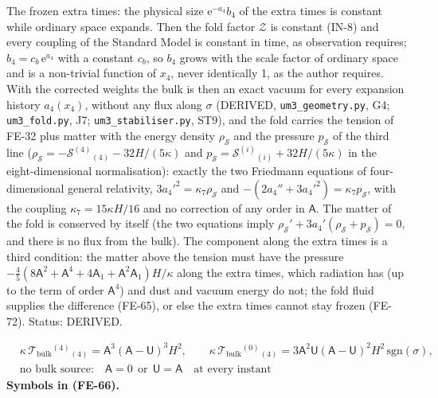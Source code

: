 \documentclass[
  10pt,
]{article}
\begin{document}
The frozen extra times: the physical size \(\mathrm{e}^{-a_4}b_4\) of
the extra times is constant while ordinary space expands. Then the fold
factor \(\mathcal{Z}\) is constant (IN-8) and every coupling of the
Standard Model is constant in time, as observation requires;
\(b_4 = c_b\,\mathrm{e}^{a_4}\) with a constant \(c_b\), so \(b_4\)
grows with the scale factor of ordinary space and is a non-trivial
function of \(x_4\), never identically 1, as the author requires. With
the corrected weights the bulk is then an exact vacuum for every
expansion history \(a_4(x_4)\), without any flux along \(\sigma\)
(DERIVED, \texttt{um3\_geometry.py}, G4; \texttt{um3\_fold.py}, J7;
\texttt{um3\_stabiliser.py}, ST9), and the fold carries the tension of
FE-32 plus matter with the energy density \(\rho_{\mathcal{S}}\) and the
pressure \(p_{\mathcal{S}}\) of the third line
(\(\rho_{\mathcal{S}} = -\mathcal{S}^{(4)}{}_{(4)} - 32H/(5\kappa)\) and
\(p_{\mathcal{S}} = \mathcal{S}^{(i)}{}_{(i)} + 32H/(5\kappa)\) in the
eight-dimensional normalisation): exactly the two Friedmann equations of
four-dimensional general relativity,
\(3a_4'^2 = \kappa_7\rho_{\mathcal{S}}\) and
\(-(2a_4'' + 3a_4'^2) = \kappa_7p_{\mathcal{S}}\), with the coupling
\(\kappa_7 = 15\kappa H/16\) and no correction of any order in
\(\mathsf{A}\). The matter of the fold is conserved by itself (the two
equations imply
\(\rho_{\mathcal{S}}' + 3a_4'(\rho_{\mathcal{S}} + p_{\mathcal{S}}) = 0\),
and there is no flux from the bulk). The component along the extra times
is a third condition: the matter above the tension must have the
pressure
\(-\frac45(8\mathsf{A}^2 + \mathsf{A}^4 + 4\mathsf{A}_1 + \mathsf{A}^2\mathsf{A}_1)H/\kappa\)
along the extra times, which radiation has (up to the term of order
\(\mathsf{A}^4\)) and dust and vacuum energy do not; the fold fluid
supplies the difference (FE-65), or else the extra times cannot stay
frozen (FE-72). Status: DERIVED.

\[
\begin{aligned}
&\kappa\,\mathcal{T}_{\mathrm{bulk}}{}^{(4)}{}_{(4)} = \mathsf{A}^3(\mathsf{A} - \mathsf{U})^3H^2,\qquad
 \kappa\,\mathcal{T}_{\mathrm{bulk}}{}^{(0)}{}_{(4)} = 3\mathsf{A}^2\mathsf{U}(\mathsf{A} - \mathsf{U})^2H^2\,\mathrm{sgn}(\sigma),\\
&\text{no bulk source:}\quad \mathsf{A} = 0\ \ \text{or}\ \ \mathsf{U} = \mathsf{A}\quad\text{at every instant}
\end{aligned} \tag{FE-66}
\] \textbf{Symbols in (FE-66).}
\end{document}
